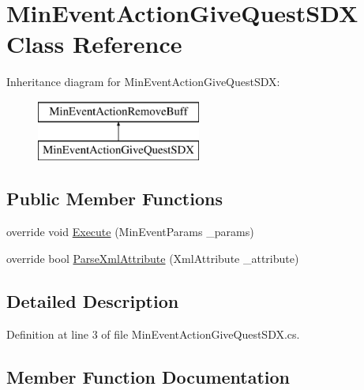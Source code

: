 \hypertarget{class_min_event_action_give_quest_s_d_x}{}\section{Min\+Event\+Action\+Give\+Quest\+S\+DX Class Reference}
\label{class_min_event_action_give_quest_s_d_x}
Inheritance diagram for Min\+Event\+Action\+Give\+Quest\+S\+DX\+:\begin{figure}[H]
\begin{center}
\leavevmode
\includegraphics[height=2.000000cm]{d2/d75/class_min_event_action_give_quest_s_d_x}
\end{center}
\end{figure}
\subsection*{Public Member Functions}
\begin{DoxyCompactItemize}
\item 
override void \mbox{\hyperlink{class_min_event_action_give_quest_s_d_x_a78ac99b8128a088a91bbe259276e1919}{Execute}} (Min\+Event\+Params \+\_\+params)
\item 
override bool \mbox{\hyperlink{class_min_event_action_give_quest_s_d_x_a38e21e977df460d768128b065dd90c7b}{Parse\+Xml\+Attribute}} (Xml\+Attribute \+\_\+attribute)
\end{DoxyCompactItemize}


\subsection{Detailed Description}


Definition at line 3 of file Min\+Event\+Action\+Give\+Quest\+S\+D\+X.\+cs.



\subsection{Member Function Documentation}
\mbox{\label{class_min_event_action_give_quest_s_d_x_a78ac99b8128a088a91bbe259276e1919}} 
